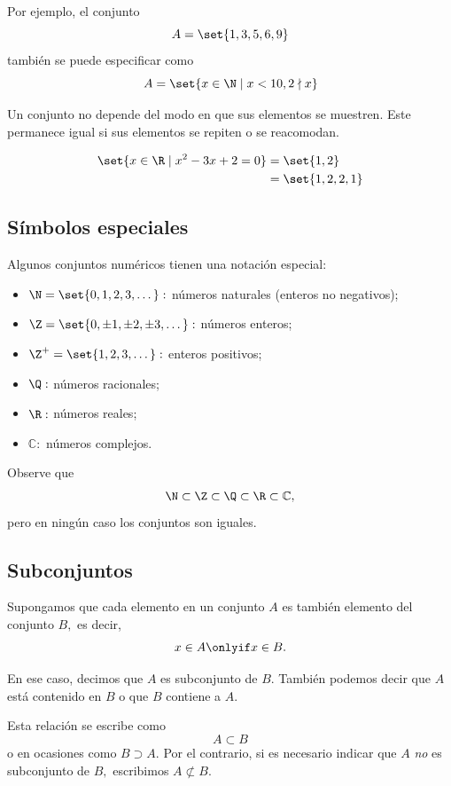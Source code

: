 	Por ejemplo, el conjunto 
	$$
	A=\set{1,3,5,6,9}
	$$
	también se puede especificar como
	$$
	A=\set{x\in \N \mid x<10, 2\nmid x }
	$$

	Un conjunto no depende del modo en que sus elementos se muestren.  Este permanece igual si sus elementos se repiten o se reacomodan.

	\begin{problema}
		\begin{align*}
			\set{x\in\R \mid x^{2}-3x+2=0} & =\set{1,2} \\
			&=\set{1,2,2,1}
		\end{align*}
	\end{problema}

\subsection{Símbolos especiales}

	Algunos conjuntos numéricos tienen una notación especial:
	\begin{itemize}
		\item $\N = \set{0,1,2,3,\dots}:$ números naturales (enteros no negativos); 
		\item $\Z = \set{0,\pm 1, \pm 2, \pm 3,\dots}:$ números enteros; 
		\item $\Z^{+} = \set{1,2,3,\dots}:$ enteros positivos;
		\item $\Q:$ números racionales; 
		\item $\R:$ números reales; 
		\item $\mathbb{C}:$ números complejos.
	\end{itemize}
	
	Observe que
	$$
	\N \subset \Z \subset \Q \subset \R \subset \mathbb{C},
	$$ pero en ningún caso los conjuntos son iguales.

\subsection{Subconjuntos}

	Supongamos que cada elemento en un conjunto $A$ es también elemento del conjunto $B,$ es decir,
	$$
	x\in A \onlyif x\in B.
	$$

	En ese caso, decimos que $A$ es subconjunto de $B.$  También podemos decir que $A$ está contenido en $B$ o que $B$ contiene a $A$.

	Esta relación se escribe como
	$$
	A \subset B 
	$$ o en ocasiones como
	$B\supset A.$  Por el contrario, si es necesario indicar que $A$ \emph{no} es  subconjunto de $B,$ escribimos $A \not\subset B.$

